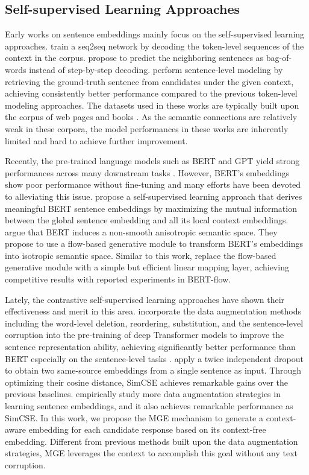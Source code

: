 \documentclass[11pt]{article}
\begin{document}
\subsection{Self-supervised Learning Approaches}
Early works on sentence embeddings mainly focus on the self-supervised learning approaches.
\citet{skip_thought} train a seq2seq network by decoding the token-level sequences of the context in the corpus.
\citet{fast_sent} propose to predict the neighboring sentences as bag-of-words instead of step-by-step decoding.
\citet{quick_thought} perform sentence-level modeling by retrieving the ground-truth sentence from candidates under the given context, achieving consistently better performance compared to the previous token-level modeling approaches.
The datasets used in these works are typically built upon the corpus of web pages and books \cite{toronto}.
As the semantic connections are relatively weak in these corpora, the model performances in these works are inherently limited and hard to achieve further improvement.

Recently, the pre-trained language models such as BERT \cite{bert} and GPT \cite{gpt_2} yield strong performances across many downstream tasks \cite{wang2018glue}.
However, BERT's embeddings show poor performance without fine-tuning and many efforts have been devoted to alleviating this issue.
\citet{is_bert} propose a self-supervised learning approach that derives meaningful BERT sentence embeddings by maximizing the mutual information between the global sentence embedding and all its local context embeddings.
\citet{bert_flow} argue that BERT induces a non-smooth anisotropic semantic space.
They propose to use a flow-based generative module to transform BERT's embeddings into isotropic semantic space.
Similar to this work, \citet{bert_whitening} replace the flow-based generative module with a simple but efficient linear mapping layer, achieving competitive results with reported experiments in BERT-flow.

Lately, the contrastive self-supervised learning approaches have shown their effectiveness and merit in this area.
\citet{wu2020clear, giorgi2020declutr, meng2021coco} incorporate the data augmentation methods including the word-level deletion, reordering, substitution, and the sentence-level corruption into the pre-training of deep Transformer models to improve the sentence representation ability, achieving significantly better performance than BERT especially on the sentence-level tasks \cite{wang2018glue, sts_b, conneau2018senteval}.
\citet{gao2021simcse} apply a twice independent dropout to obtain two same-source embeddings from a single sentence as input.
Through optimizing their cosine distance, SimCSE achieves remarkable gains over the previous baselines.
\citet{yan2021consert} empirically study more data augmentation strategies in learning sentence embeddings, and it also achieves remarkable performance as SimCSE.
In this work, we propose the MGE mechanism to generate a context-aware embedding for each candidate response based on its context-free embedding.
Different from previous methods built upon the data augmentation strategies, MGE leverages the context to accomplish this goal without any text corruption.
\end{document}
